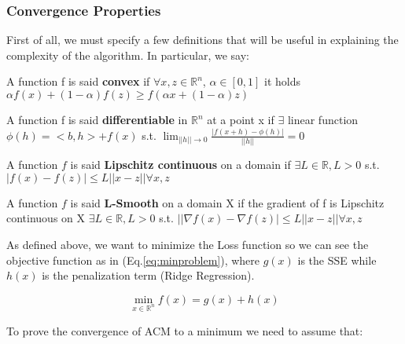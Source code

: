 \subsubsection{Convergence Properties}
First of all, we must specify a few definitions that will be useful in explaining the complexity of the algorithm. In particular, we say:

\begin{definition}
    \label{def:convex_function}
    A function f is said \textbf{convex} if $\forall x, z \in \mathbb{R}^n$, $ \alpha \in [0,1] $ it holds $ \alpha f(x) + (1-\alpha )f(z) \geq f(\alpha x + (1- \alpha ) z)$
\end{definition}


\begin{definition}
    \label{def:differentiable_function}
    A function f is said \textbf{differentiable} in $\mathbb{R}^n$ at a point x if $\exists$ linear function $\phi(h) = <b,h> + f(x)$ s.t.
    $\lim_{||h|| \to 0} \frac{|f(x+h) - \phi (h)|}{||h||} = 0$
    
\end{definition}

\begin{definition}
    \label{def:LC}
    A function $f$ is said \textbf{Lipschitz continuous} on a domain if 
    $\exists L \in \mathbb{R}, L > 0$  s.t. $| f(x) - f(z)| \leq L|| x -z || \forall x,z  $
\end{definition}


\begin{definition}
    \label{def:Lsmooth}
    A function $f$ is said \textbf{L-Smooth} on a domain X if the gradient of f is Lipschitz continuous on X  
    $\exists L \in \mathbb{R}, L > 0$  s.t. $|| \nabla f(x) - \nabla f(z)| \leq L|| x -z || \forall x,z  $
\end{definition}



As defined above, we want to minimize the Loss function so we can see the objective function as in (Eq.\ref{eq:minproblem}), where $g(x)$ is the SSE while $h(x)$ is the penalization term (Ridge Regression).

\begin{equation}
\label{eq:minproblem}
\min_{x \in \mathbb{R}^n} f(x) = g(x) + h(x)
\end{equation}

To prove the convergence of ACM to a minimum we need to assume that: 


